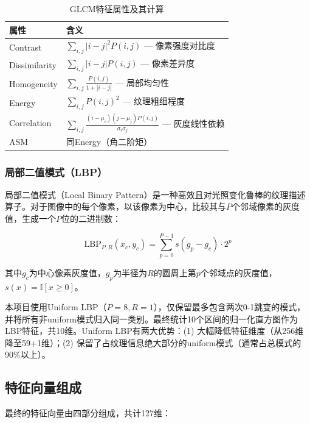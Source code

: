 \documentclass[UTF8,a4paper,12pt]{ctexart}
\numberwithin{figure}{section}
\numberwithin{table}{section}
\begin{document}
\begin{table}[H]
\centering
\caption{GLCM特征属性及其计算}
\label{tab:glcm_props}
\begin{tabular}{ll}
\toprule
\textbf{属性} & \textbf{含义} \\
\midrule
Contrast & $\sum_{i,j} |i-j|^2 P(i,j)$ — 像素强度对比度 \\
Dissimilarity & $\sum_{i,j} |i-j| P(i,j)$ — 像素差异度 \\
Homogeneity & $\sum_{i,j} \frac{P(i,j)}{1+|i-j|}$ — 局部均匀性 \\
Energy & $\sum_{i,j} P(i,j)^2$ — 纹理粗细程度 \\
Correlation & $\sum_{i,j} \frac{(i-\mu_i)(j-\mu_j)P(i,j)}{\sigma_i\sigma_j}$ — 灰度线性依赖 \\
ASM & 同Energy（角二阶矩） \\
\bottomrule
\end{tabular}
\end{table}

\subsubsection{局部二值模式（LBP）}

局部二值模式（Local Binary Pattern）是一种高效且对光照变化鲁棒的纹理描述算子。对于图像中的每个像素，以该像素为中心，比较其与$P$个邻域像素的灰度值，生成一个$P$位的二进制数：

\begin{equation}
\text{LBP}_{P,R}(x_c, y_c) = \sum_{p=0}^{P-1} s(g_p - g_c) \cdot 2^p
\end{equation}

其中$g_c$为中心像素灰度值，$g_p$为半径为$R$的圆周上第$p$个邻域点的灰度值，$s(x) = \mathbb{I}[x \geq 0]$。

本项目使用Uniform LBP（$P=8, R=1$），仅保留最多包含两次0-1跳变的模式，并将所有非uniform模式归入同一类别。最终统计10个区间的归一化直方图作为LBP特征，共10维。Uniform LBP有两大优势：(1) 大幅降低特征维度（从256维降至59+1维）；(2) 保留了占纹理信息绝大部分的uniform模式（通常占总模式的90\%以上）。

\subsection{特征向量组成}

最终的特征向量由四部分组成，共计127维：
\end{document}
